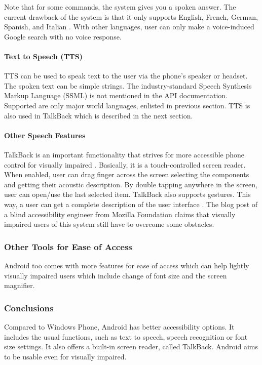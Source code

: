 Note that for some commands, the system gives you a spoken answer. The current drawback of the system is that it only supports English, French, German, Spanish, and Italian \cite{androidTTS}. With other languages, user can only make a voice-induced Google search with no voice response.

\paragraph{Text to Speech (TTS)}
TTS can be used to speak text to the user via the phone's speaker or headset. The spoken text can be simple strings. The industry-standard Speech Synthesis Markup Language (SSML) is not mentioned in the API documentation. Supported are only major world languages, enlisted in previous section. TTS is also used in TalkBack which is described in the next section.

\paragraph{Other Speech Features}
TalkBack is an important functionality that strives for more accessible phone control for visually impaired \cite{androidAccbility}. Basically, it is a touch-controlled screen reader. When enabled, user can drag finger across the screen selecting the components and getting their acoustic description. By double tapping anywhere in the screen, user can open/use the last selected item. TalkBack also supports gestures. This way, a user can get a complete description of the user interface \cite{androidAccbility}. The blog post of a blind accessibility engineer from Mozilla Foundation \cite{mozillaguy} claims that visually impaired users of this system still have to overcome some obstacles.

\subsubsection{Other Tools for Ease of Access}
Android too comes with more features for ease of access which can help lightly visually impaired users which include change of font size and the screen magnifier.

\subsubsection{Conclusions}
Compared to Windows Phone, Android has better accessibility options. It includes the usual functions, such as text to speech, speech recognition or font size settings. It also offers a built-in screen reader, called TalkBack. Android aims to be usable even for visually impaired.

